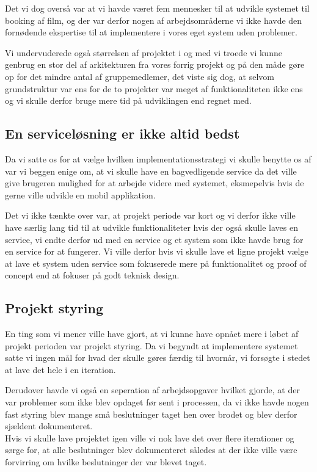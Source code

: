 Det vi dog overså var at vi havde været fem mennesker til at udvikle systemet til booking af film, og der var derfor nogen af arbejdsområderne vi ikke havde den fornødende ekspertise til at implementere i vores eget system uden problemer.

Vi undervuderede også størrelsen af projektet i og med vi troede vi kunne genbrug en stor del af arkitekturen fra vores forrig projekt og på den måde gøre op for det mindre antal af gruppemedlemer, det viste sig dog, at selvom grundstruktur var ens for de to projekter var meget af funktionaliteten ikke ens og vi skulle derfor bruge mere tid på udviklingen end regnet med.

\subsection{En serviceløsning er ikke altid bedst}
\label{Konklusion_Lessons_Service}
Da vi satte os for at vælge hvilken implementationsstrategi vi skulle benytte os af var vi beggen enige om, at vi skulle have en bagvedligende service da det ville give brugeren mulighed for at arbejde videre med systemet, eksmepelvis hvis de gerne ville udvikle en mobil applikation.

Det vi ikke tænkte over var, at projekt periode var kort og vi derfor ikke ville have særlig lang tid til at udvikle funktionaliteter hvis der også skulle laves en service, vi endte derfor ud med en service og et system som ikke havde brug for en service for at fungerer.
Vi ville derfor hvis vi skulle lave et ligne projekt vælge at lave et system uden service som fokuserede mere på funktionalitet og proof of concept end at fokuser på godt teknisk design.

\subsection{Projekt styring}
\label{Konklusion_Lessons_Styring}
En ting som vi mener ville have gjort, at vi kunne have opnået mere i løbet af projekt perioden var projekt styring. Da vi begyndt at implementere systemet satte vi ingen mål for hvad der skulle gøres færdig til hvornår, vi forsøgte i stedet at lave det hele i en iteration.

Derudover havde vi også en seperation af arbejdsopgaver hvilket gjorde, at der var problemer som ikke blev opdaget før sent i processen, da vi ikke havde nogen fast styring blev mange små beslutninger taget hen over brodet og blev derfor sjældent dokumenteret.
\\ Hvis vi skulle lave projektet igen ville vi nok lave det over flere iterationer og sørge for, at alle beslutninger blev dokumenteret således at der ikke ville være forvirring om hvilke beslutninger der var blevet taget.   